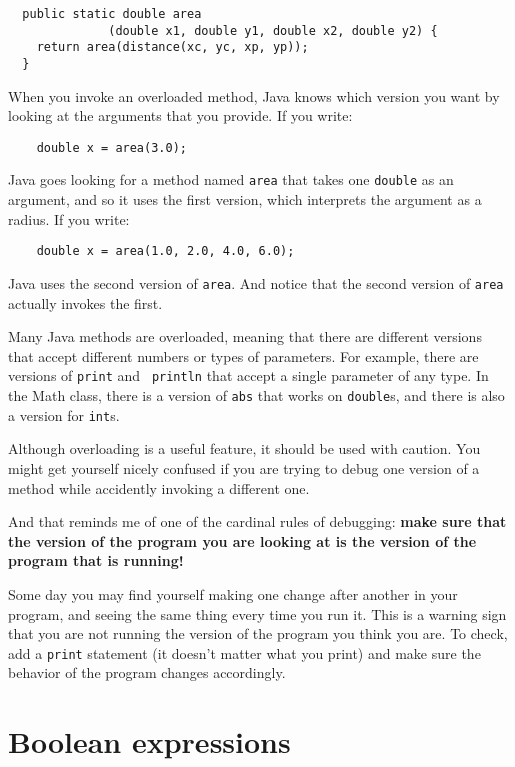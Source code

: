 \documentclass[12pt]{book}
\theoremstyle{definition}
\begin{document}
\begin{lstlisting}
  public static double area
              (double x1, double y1, double x2, double y2) {
    return area(distance(xc, yc, xp, yp));
  } 
\end{lstlisting}
%
When you invoke an overloaded method, Java knows which version you
want by looking at the arguments that you provide.  If you write:

\begin{lstlisting}
    double x = area(3.0);
\end{lstlisting}
%
Java goes looking for a method named {\tt area} that
takes one {\tt double} as an argument, and so it uses the
first version, which interprets the argument as a radius.
If you write:

\begin{lstlisting}
    double x = area(1.0, 2.0, 4.0, 6.0);
\end{lstlisting}
%
Java uses the second version of {\tt area}.  And notice that the
second version of {\tt area} actually invokes the first.

Many Java methods are overloaded, meaning that there
are different versions that accept different numbers or types of
parameters.  For example, there are versions of {\tt print} and {\tt
println} that accept a single parameter of any type.  In the Math
class, there is a version of {\tt abs} that works on {\tt double}s,
and there is also a version for {\tt int}s.

Although overloading is a useful feature, it should be used
with caution.  You might get yourself nicely confused if you
are trying to debug one version of a method while accidently
invoking a different one.

And that reminds me of one of the cardinal rules of
debugging: {\bf make sure that the version of the program
you are looking at is the version of the program that is running!}

Some day you may find yourself making one change after another
in your program, and seeing the same thing every time you run it.
This is a warning sign that you are
not running the version of the program you think you are.  To
check, add a {\tt print} statement (it doesn't matter what
you print) and make sure the behavior of the program changes
accordingly.


\section{Boolean expressions}
\end{document}

